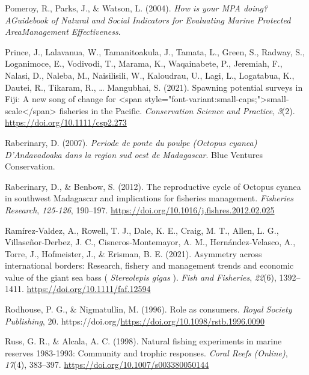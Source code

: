 \documentclass[
]{article}
\newlength{\cslhangindent}
\newlength{\cslentryspacingunit} %
\newenvironment{CSLReferences}[2] %
 {%
  \setlength{\parindent}{0pt}
  \ifodd #1
  \let\oldpar\par
  \def\par{\hangindent=\cslhangindent\oldpar}
  \fi
  \setlength{\parskip}{#2\cslentryspacingunit}
 }%
 {}
\begin{document}
\begin{CSLReferences}{1}{0}
\leavevmode{}%
Pomeroy, R., Parks, J., \& Watson, L. (2004). \emph{How is your {MPA} doing? {AGuidebook} of {Natural} and {Social} {Indicators} for {Evaluating} {Marine} {Protected} {AreaManagement} {Effectiveness}}.

\leavevmode{}%
Prince, J., Lalavanua, W., Tamanitoakula, J., Tamata, L., Green, S., Radway, S., Loganimoce, E., Vodivodi, T., Marama, K., Waqainabete, P., Jeremiah, F., Nalasi, D., Naleba, M., Naisilisili, W., Kaloudrau, U., Lagi, L., Logatabua, K., Dautei, R., Tikaram, R., \ldots{} Mangubhai, S. (2021). Spawning potential surveys in {Fiji}: {A} new song of change for {\textless{}}span style="font-variant:small-caps;"{\textgreater{}}small‐scale{\textless{}}/span{\textgreater{}} fisheries in the {Pacific}. \emph{Conservation Science and Practice}, \emph{3}(2). \url{https://doi.org/10.1111/csp2.273}

\leavevmode{}%
Raberinary, D. (2007). \emph{Periode de ponte du poulpe ({Octopus} cyanea) {D}'{Andavadoaka} dans la region sud oest de {Madagascar}}. Blue Ventures Conservation.

\leavevmode{}%
Raberinary, D., \& Benbow, S. (2012). The reproductive cycle of {Octopus} cyanea in southwest {Madagascar} and implications for fisheries management. \emph{Fisheries Research}, \emph{125-126}, 190--197. \url{https://doi.org/10.1016/j.fishres.2012.02.025}

\leavevmode{}%
Ramírez‐Valdez, A., Rowell, T. J., Dale, K. E., Craig, M. T., Allen, L. G., Villaseñor‐Derbez, J. C., Cisneros‐Montemayor, A. M., Hernández‐Velasco, A., Torre, J., Hofmeister, J., \& Erisman, B. E. (2021). Asymmetry across international borders: {Research}, fishery and management trends and economic value of the giant sea bass ( \emph{{Stereolepis} gigas} ). \emph{Fish and Fisheries}, \emph{22}(6), 1392--1411. \url{https://doi.org/10.1111/faf.12594}

\leavevmode{}%
Rodhouse, P. G., \& Nigmatullin, M. (1996). Role as consumers. \emph{Royal Society Publishing}, 20. https://doi.org/\url{https://doi.org/10.1098/rstb.1996.0090}

\leavevmode{}%
Russ, G. R., \& Alcala, A. C. (1998). Natural fishing experiments in marine reserves 1983-1993: Community and trophic responses. \emph{Coral Reefs (Online)}, \emph{17}(4), 383--397. \url{https://doi.org/10.1007/s003380050144}


\end{CSLReferences}
\end{document}
